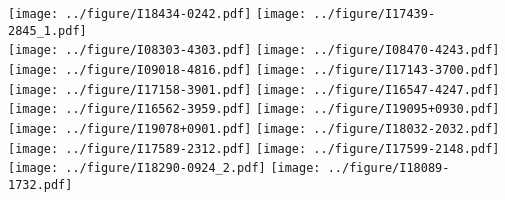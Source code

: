 \documentclass{article}
\begin{document}
\noindent

\texttt{[image: ../figure/I18434-0242.pdf]}
\texttt{[image: ../figure/I17439-2845\_1.pdf]}
\\
\texttt{[image: ../figure/I08303-4303.pdf]}
\texttt{[image: ../figure/I08470-4243.pdf]}
\\
\texttt{[image: ../figure/I09018-4816.pdf]}
\texttt{[image: ../figure/I17143-3700.pdf]}
\\
\texttt{[image: ../figure/I17158-3901.pdf]}
\texttt{[image: ../figure/I16547-4247.pdf]}
\\
\texttt{[image: ../figure/I16562-3959.pdf]}
\texttt{[image: ../figure/I19095+0930.pdf]}
\\
\texttt{[image: ../figure/I19078+0901.pdf]}
\texttt{[image: ../figure/I18032-2032.pdf]}
\\
\texttt{[image: ../figure/I17589-2312.pdf]}
\texttt{[image: ../figure/I17599-2148.pdf]}
\\
\texttt{[image: ../figure/I18290-0924\_2.pdf]}
\texttt{[image: ../figure/I18089-1732.pdf]}
\\
\end{document}
